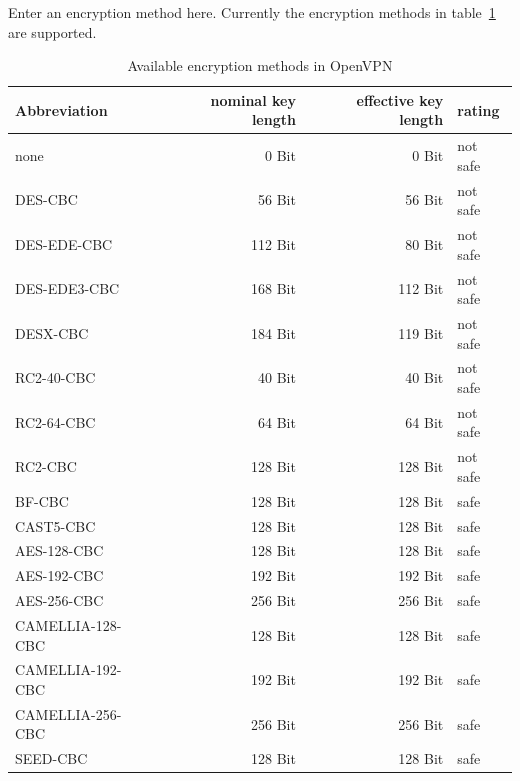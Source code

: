 \begin{description}


  Enter an encryption method here. Currently the encryption methods
  in table~\ref{openvpn:ciphers} are supported.

  \begin{table}[!ht]
    \centering
    \caption{Available encryption methods in OpenVPN}
    \label{openvpn:ciphers}
    \begin{tabular}{|p{4cm}|r|r|l|}
      \hline
      Abbreviation	& nominal key length & effective key length & rating \\
      \hline
      none             &   0 Bit &   0 Bit & not safe \\
      DES-CBC          &  56 Bit &  56 Bit & not safe \\
      DES-EDE-CBC      & 112 Bit &  80 Bit & not safe \\
      DES-EDE3-CBC     & 168 Bit & 112 Bit & not safe \\
      DESX-CBC         & 184 Bit & 119 Bit & not safe \\
      RC2-40-CBC       &  40 Bit &  40 Bit & not safe \\
      RC2-64-CBC       &  64 Bit &  64 Bit & not safe \\
      RC2-CBC          & 128 Bit & 128 Bit & not safe \\
      BF-CBC           & 128 Bit & 128 Bit & safe \\
      CAST5-CBC        & 128 Bit & 128 Bit & safe \\
      AES-128-CBC      & 128 Bit & 128 Bit & safe \\
      AES-192-CBC      & 192 Bit & 192 Bit & safe \\
      AES-256-CBC      & 256 Bit & 256 Bit & safe \\
      CAMELLIA-128-CBC & 128 Bit & 128 Bit & safe \\
      CAMELLIA-192-CBC & 192 Bit & 192 Bit & safe \\
      CAMELLIA-256-CBC & 256 Bit & 256 Bit & safe \\
      SEED-CBC         & 128 Bit & 128 Bit & safe \\
      \hline
    \end{tabular}
  \end{table}



\end{description}
